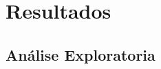 \chapter{Resultados}
\label{cap:resultados}


\section{Análise Exploratoria}
\label{cap:resultados:sec:analise_exploratoria}







